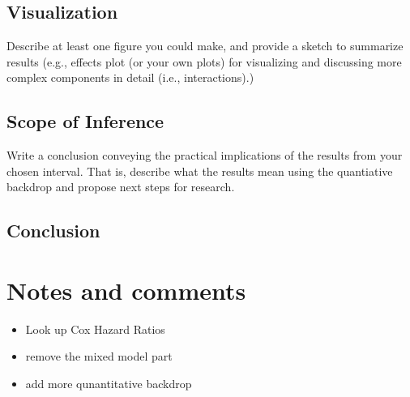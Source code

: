\documentclass[11pt]{article}
\begin{document}
\subsection{Visualization}
\label{sec:org7a0bf9a}

Describe at least one figure you could make, and provide a sketch to summarize results (e.g., effects plot (or your own plots) for visualizing and discussing more complex components in detail (i.e., interactions).)

\subsection{Scope of Inference}
\label{sec:org53a5369}

Write a conclusion conveying the practical implications of the results from your chosen interval. That is, describe what the results mean using the quantiative backdrop and propose next steps for research.


\subsection{Conclusion}
\label{sec:orgf076d11}

\section{Notes and comments}
\label{sec:orgb95e226}

\begin{itemize}
\item Look up Cox Hazard Ratios
\item remove the mixed model part
\item add more qunantitative backdrop
\end{itemize}
\end{document}
